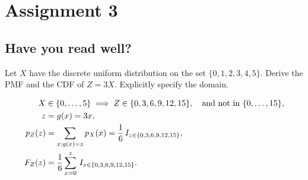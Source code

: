 \documentclass[assignments]{subfiles}
\begin{document}
\section{Assignment 3}


\subsection{Have you read well?}


\begin{exercise}
Let $X$ have the discrete uniform distribution on the set $\{0, 1, 2, 3, 4, 5\}$. Derive the PMF and the CDF of $Z=3X$. Explicitly specify the domain.
\begin{solution}
  \begin{align}
    \label{eq:17}
    X &\in \{0, \ldots, 5\} \implies Z \in \{0, 3, 6, 9, 12, 15\}, \quad \text{and not in } \{0, \ldots, 15\},\\
z &= g(x) = 3x,\\
p_{Z}(z) &= \sum_{x: g(x) =z } p_{X}(x) = \frac{1}{6} \,I_{z \in \{0, 3, 6, 9, 12, 15\}}, \\
F_{Z}(z) &=\frac{1}{6} \sum_{x=0}^{z} \,I_{x \in \{0, 3, 6, 9, 12, 15\}}.
  \end{align}
\end{solution}
\end{exercise}
\end{document}
